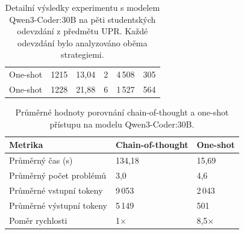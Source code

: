 \begin{table}[H]
{\begin{tabular}{llllll}
            One-shot           & 1215               & 13,04            & 2                 & 4\,508                  & 305                      \\
            One-shot           & 1228               & 21,88            & 6                 & 1\,527                  & 564                      \\
            \bottomrule
        \end{tabular}
    }
    \caption{Detailní výsledky experimentu s modelem Qwen3-Coder:30B na pěti studentských odevzdání z předmětu UPR\@. Každé odevzdání bylo analyzováno oběma strategiemi.}
    \label{tab:cot-vs-oneshot-detail}
\end{table}

\begin{table}[H]
    \centering
    \caption{Naměřená spotřeba tokenů při analýze studentských odevzdání dle .}
    \label{tab:token-usage}
\end{table}

\begin{table}[H]
    \centering
    \begin{tabular}{lll}
        \toprule
        \textbf{Metrika} & \textbf{Chain-of-thought} & \textbf{One-shot} \\
        \midrule
        Průměrný čas (s)             & 134,18    & 15,69 \\
        Průměrný počet problémů      & 3,0       & 4,6 \\
        Průměrné vstupní tokeny      & 9\,053    & 2\,043 \\
        Průměrné výstupní tokeny     & 5\,149    & 501 \\
        Poměr rychlosti              & 1$\times$ & 8,5$\times$ \\
        \bottomrule
    \end{tabular}
    \caption{Průměrné hodnoty porovnání chain-of-thought a one-shot přístupu na modelu Qwen3-Coder:30B.}
    \label{tab:cot-vs-oneshot-summary}
\end{table}

